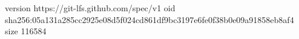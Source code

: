 version https://git-lfs.github.com/spec/v1
oid sha256:05a131a285cc2925e08d5f024cd861df9bc3197e6fe0f38b0e09a91858eb8af4
size 116584
